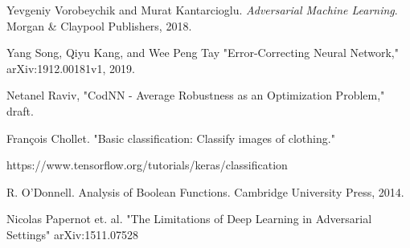 \documentclass{article}
\DeclareMathOperator{\1}{\mathbb{1}}
\begin{document}
\begin{thebibliography}{alpha}

	Yevgeniy Vorobeychik and Murat Kantarcioglu.
	\textit{Adversarial Machine Learning}.
	Morgan \& Claypool Publishers, 2018.
	
	Yang Song, Qiyu Kang, and Wee Peng Tay
	"Error-Correcting Neural Network,"
	arXiv:1912.00181v1, 2019.
	
	Netanel Raviv,
	"CodNN - Average Robustness as an Optimization Problem,"
	draft.
	
	François Chollet. "Basic classification: Classify images of clothing."
	
	https://www.tensorflow.org/tutorials/keras/classification
	
	R. O'Donnell. Analysis of Boolean Functions. Cambridge University Press, 2014.
	
	Nicolas Papernot et. al.
	"The Limitations of Deep Learning in Adversarial Settings"
	arXiv:1511.07528
	
		
\end{thebibliography}
\end{document}
